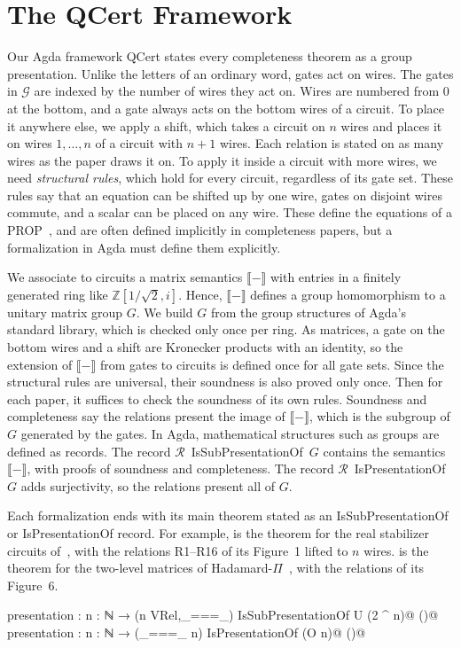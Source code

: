 \documentclass[acmsmall,nonacm,11pt,screen]{acmart}
\newcommand{\aid}[1]{\mbox{\textsf{\small #1}}}
\newcounter{agdastmt}
\newcommand{\agdatag}[1]{\hfill\normalfont\normalsize
  \refstepcounter{agdastmt}(\theagdastmt)\label{#1}}
\newcommand{\Z}{\mathbb{Z}}
\begin{document}
\section{The QCert Framework}
\label{sec:form}

Our Agda framework QCert states every completeness theorem as a group presentation.
Unlike the letters of an ordinary word, gates act on wires. The gates in $\mathcal{G}$ are indexed by the number of wires they act on. Wires are numbered from $0$ at the bottom, and a gate always acts on the bottom wires of a circuit. To place it anywhere else, we apply a shift, which takes a circuit on $n$ wires and places it on wires $1,\dots,n$ of a circuit with $n+1$ wires. Each relation is stated on as many wires as the paper draws it on. To apply it inside a circuit with more wires, we need \emph{structural rules}, which hold for every circuit, regardless of its gate set. These rules say that an equation can be shifted up by one wire, gates on disjoint wires commute, and a scalar can be placed on any wire. These define the equations of a PROP~\cite{MacLane1965categorical}, and are often defined implicitly in completeness papers, but a formalization in Agda must define them explicitly.

We associate to circuits a matrix semantics $\llbracket - \rrbracket$ with entries in a finitely generated ring like $\Z\left[1/\sqrt2,i\right]$. Hence, $\llbracket - \rrbracket$ defines a group homomorphism to a unitary matrix group $G$. We build $G$ from the group structures of Agda's standard library, which is checked only once per ring. As matrices, a gate on the bottom wires and a shift are Kronecker products with an identity, so the extension of $\llbracket - \rrbracket$ from gates to circuits is defined once for all gate sets. Since the structural rules are universal, their soundness is also proved only once. Then for each paper, it suffices to check the soundness of its own rules.
Soundness and completeness say the relations present the image of $\llbracket - \rrbracket$, which is the subgroup of $G$ generated by the gates. In Agda, mathematical structures such as groups are defined as records.
The record $\mathcal{R}$~\aid{IsSubPresentationOf}~$G$ contains the semantics $\llbracket - \rrbracket$, with proofs of soundness and completeness. The record $\mathcal{R}$~\aid{IsPresentationOf}~$G$ adds surjectivity, so the relations present all of $G$.

Each formalization ends with its main theorem stated as an \aid{IsSubPresentationOf} or \aid{IsPresentationOf} record. For example,  is the theorem for the real stabilizer circuits of~\cite{makary2021real}, with the relations R1--R16 of its Figure~1 lifted to $n$ wires.  is the theorem for the two-level matrices of Hadamard-$\Pi$~\cite{fang2026hadamard}, with the relations of its Figure~6.
\begin{agdacode}[escapechar=@]
presentation : {n : ℕ} → (n VRel,_===_) IsSubPresentationOf U (2 ^ n)@\agdatag{agda:stab}@
presentation : {n : ℕ} → (_===_ {n}) IsPresentationOf (O n)@\agdatag{agda:hpi}@
\end{agdacode}
\end{document}
